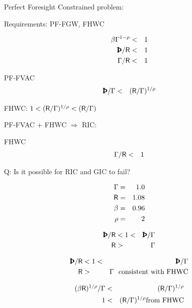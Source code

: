 \documentclass[titlepage,abstract]{bejournal}
\begin{document}
Perfect Foresight Constrained problem:

Requirements: PF-FGW, FHWC

\begin{eqnarray}
    \beta \PGro^{1-\CRRA} & < & 1   \label{eq:PFFVAC}
\\  \Pat/\Rfree & < & 1 \label{eq:RIC}
\\  \PGro/\Rfree & < & 1  \label{eq:FHWC}
\end{eqnarray}

PF-FVAC
\begin{eqnarray}
  \Pat/\PGro & < & (\Rfree/\PGro)^{1/\CRRA} \label{eq:RIC}
\end{eqnarray}

FHWC: $1 < (\mathsf{R}/\Gamma)^{1/\rho} < (\mathsf{R}/\Gamma)$

PF-FVAC + FHWC $\Rightarrow$ RIC:


FHWC
\begin{eqnarray}
  \Gamma/\mathsf{R} & < & 1  \label{eq:PFFVAC}
\end{eqnarray}


Q: Is it possible for RIC and GIC to fail?


\begin{eqnarray}
  \Gamma & = & 1.0
\\ \mathsf{R} & = & 1.08
\\ \beta  & = & 0.96
\\ \rho & = & 2
\end{eqnarray}



\begin{eqnarray}
  \label{eq:GICFails}
  \Pat/\Rfree & < 1  < & \Pat/\PGro 
\\ \Rfree & > & \PGro
\end{eqnarray}

\begin{eqnarray}
  \label{eq:GICFails}
  \Pat/\Rfree & < 1  < & \Pat/\PGro 
\\ \Rfree & > & \PGro \text{~~consistent with FHWC}
\end{eqnarray}

\begin{eqnarray}
  \label{eq:1}
  (\beta \mathsf{R})^{1/\rho}/\Gamma & < & (\mathsf{R}/\Gamma)^{1/\rho} 
\\ 1 & < &  (\mathsf{R}/\Gamma)^{1/\rho} \text{from FHWC}
\end{eqnarray}
\end{document}
